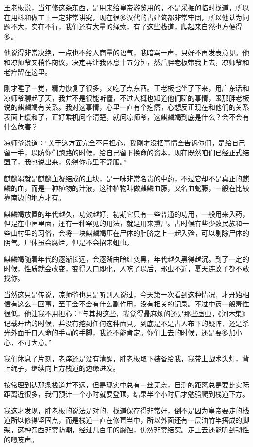 王老板说，当年修这条东西，是用来给皇帝游览用的，不是采掘的临时栈道，所以在用料和做工上一定非常讲究，现在很多汉代的古建筑都非常牢固，所以他认为问题不大，实在不行，我们还有大量的绳索，有了这些栈道，爬起来自然也方便得多。

他说得非常决绝，一点也不给人商量的语气，我暗骂一声，只好不再发表意见。他和凉师爷又稍作商议，决定再让我休息十五分钟，然后胖老板带我上去，凉师爷和老痒留在这里。

刚才睡了一觉，精力恢复了很多，又吃了点东西。王老板也坐了下来，用广东话和凉师爷聊起了天，我并不是很能听懂，不过大概也知道他们聊的事情，跟那胖老板说的麒麟竭有关系。我对这事情，心里一直有个疙瘩，心想反正现在和他们的关系表面上缓和了，正好乘机问个清楚，就问凉师爷，这麒麟竭到底是什么？会不会有什么危害？

凉师爷说道：“关于这方面完全不用担心，我刚才没把事情全告诉你们，是给自己留一手，以防你们跑路的时候，给自己留下换命的资本，现在既然咱们已经正式结盟了，我也说出来，免得你心里不舒服。”

麒麟竭就是麒麟血凝结成的血块，是一味非常名贵的中药，不过它却不是真正的麒麟的血，而是一种植物的汁液，这种植物叫做麒麟血藤，又名血蛇藤，一般在比较靠南边的地方才有。

麒麟竭放置的年代越久，功效越好，初期它只有一些普通的功用，一般用来入药，但是在中医里面，还有一种罕见的用法，就是用来熏尸。古时候有些少数民族和一些山村里的习俗，会将一块麒麟竭压在尸体的肚脐之上一起入殓，可以剔除尸体的阴气，尸体虽会腐烂，但是不会招来蛆虫。

麒麟竭随着年代的逐渐长远，会逐渐由暗红变黑，年代越久黑得越沉。到了一定的时候，性质就会改变，变得入口即化，人吃了以后，邪虫不近，夏天连蚊子都不敢找你。

当然这只是传说，凉师爷也只是听别人说过，今天第一次看到这种情况，才开始相信有这么一回事，至于会不会有什么副作用，没有相关的记录。不过中药一般毒性很低，他让我不用担心：“与其想这些，我觉得最麻烦的还是那些蛊虫，《河木集》记载开凿的时候，并没有挖到任何这种面具，到底是不是古人布下的疑阵，还是杀光外面千口人命的手动的手脚，我还不能肯定。你们上去的时候，还是要多加小心，不可大意。”

我们休息了片刻，老痒还是没有清醒，胖老板取下装备给我，我带上战术头灯，背上绳子，继续向上方栈道的边缘进发。

按常理到达那条栈道并不远，但是现实中总有一丝无奈，目测的距离总是要比实际距离近很多，我们预计一个小时就要登顶，结果半个小时后才勉强爬到栈道下方。

我这才发现，胖老板的说法是对的，栈道保存得非常好，倒不是因为皇帝要走的栈道所以修得坚固点，而是栈道一直在修葺当中，所以外面还有一层油竹竿搭成的脚架，这种东西非常防潮，经过几百年的腐蚀，仍然非常结实。走上去还能听到韧性的嘎吱声。

